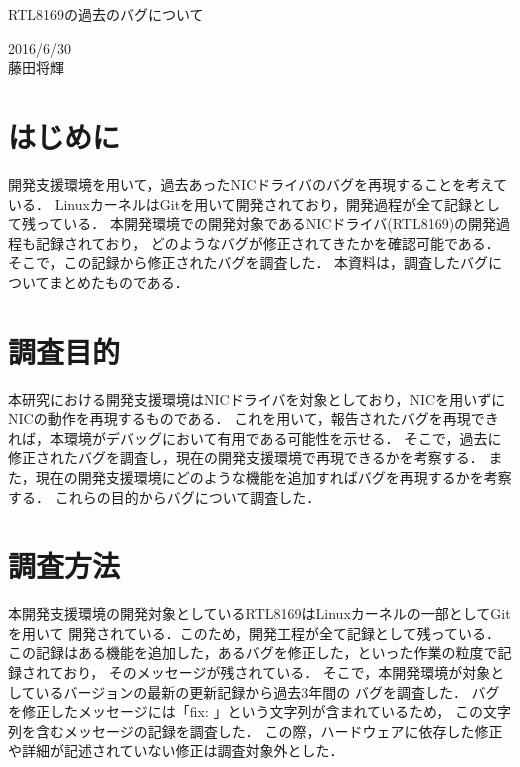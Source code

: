 \documentclass[12pt]{jsarticle}
\begin{document}

\begin{center}
    {\LARGE RTL8169の過去のバグについて}
\end{center}

\begin{flushright}
    2016/6/30\\
    藤田将輝
\end{flushright}
\section{はじめに}
開発支援環境を用いて，過去あったNICドライバのバグを再現することを考えている．
LinuxカーネルはGitを用いて開発されており，開発過程が全て記録として残っている．
本開発環境での開発対象であるNICドライバ(RTL8169)の開発過程も記録されており，
どのようなバグが修正されてきたかを確認可能である．
そこで，この記録から修正されたバグを調査した．
本資料は，調査したバグについてまとめたものである．

\section{調査目的}
本研究における開発支援環境はNICドライバを対象としており，NICを用いずにNICの動作を再現するものである．
これを用いて，報告されたバグを再現できれば，本環境がデバッグにおいて有用である可能性を示せる．
そこで，過去に修正されたバグを調査し，現在の開発支援環境で再現できるかを考察する．
また，現在の開発支援環境にどのような機能を追加すればバグを再現するかを考察する．
これらの目的からバグについて調査した．

\section{調査方法}
本開発支援環境の開発対象としているRTL8169はLinuxカーネルの一部としてGitを用いて
開発されている．このため，開発工程が全て記録として残っている．
この記録はある機能を追加した，あるバグを修正した，といった作業の粒度で記録されており，
そのメッセージが残されている．
そこで，本開発環境が対象としているバージョンの最新の更新記録から過去3年間の
バグを調査した．
バグを修正したメッセージには「fix: 」という文字列が含まれているため，
この文字列を含むメッセージの記録を調査した．
この際，ハードウェアに依存した修正や詳細が記述されていない修正は調査対象外とした．
\end{document}
